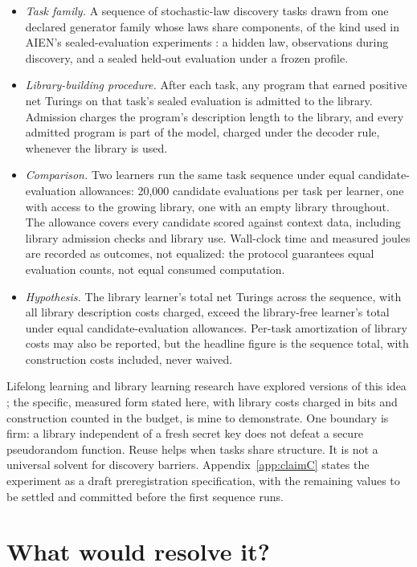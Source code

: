 \documentclass[11pt]{article}
\begin{document}
\begin{itemize}
\item \emph{Task family.} A sequence of stochastic-law discovery tasks drawn from one declared generator family whose laws share components, of the kind used in AIEN's sealed-evaluation experiments \cite{stapleton2026a, stapleton2026b}: a hidden law, observations during discovery, and a sealed held-out evaluation under a frozen profile.
\item \emph{Library-building procedure.} After each task, any program that earned positive net Turings on that task's sealed evaluation is admitted to the library. Admission charges the program's description length to the library, and every admitted program is part of the model, charged under the decoder rule, whenever the library is used.
\item \emph{Comparison.} Two learners run the same task sequence under equal candidate-evaluation allowances: 20,000 candidate evaluations per task per learner, one with access to the growing library, one with an empty library throughout. The allowance covers every candidate scored against context data, including library admission checks and library use. Wall-clock time and measured joules are recorded as outcomes, not equalized: the protocol guarantees equal evaluation counts, not equal consumed computation.
\item \emph{Hypothesis.} The library learner's total net Turings across the sequence, with all library description costs charged, exceed the library-free learner's total under equal candidate-evaluation allowances. Per-task amortization of library costs may also be reported, but the headline figure is the sequence total, with construction costs included, never waived.
\end{itemize}

Lifelong learning and library learning research have explored versions of this idea \cite{chenliu2018, dreamcoder2021, thrunmitchell1995}; the specific, measured form stated here, with library costs charged in bits and construction counted in the budget, is mine to demonstrate. One boundary is firm: a library independent of a fresh secret key does not defeat a secure pseudorandom function. Reuse helps when tasks share structure. It is not a universal solvent for discovery barriers. Appendix~\ref{app:claimC} states the experiment as a draft preregistration specification, with the remaining values to be settled and committed before the first sequence runs.

\section*{What would resolve it?}
\end{document}
